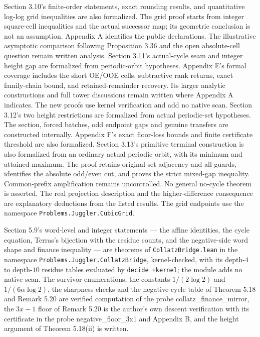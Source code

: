 \documentclass[12pt]{article}
\begin{document}
Section 3.10's finite-order statements, exact rounding results, and
quantitative log-log grid inequalities are also formalized. The grid
proof starts from integer square-cell inequalities and the actual
successor map; its geometric conclusion is not an assumption. Appendix A
identifies the public declarations. The illustrative asymptotic
comparison following Proposition 3.36 and the open absolute-cell
question remain written analysis. Section 3.11's actual-cycle seam and
integer height gap are formalized from periodic-orbit hypotheses.
Appendix E's formal coverage includes the short OE/OOE cells,
subtractive rank returns, exact family-chain bound, and
retained-remainder recovery. Its larger analytic constructions and full
tower discussions remain written where Appendix A indicates. The new
proofs use kernel verification and add no native scan. Section 3.12's
two height restrictions are formalized from actual periodic-set
hypotheses. The section, forced batches, odd endpoint gaps and genuine
transfers are constructed internally. Appendix F's exact floor-loss
bounds and finite certificate threshold are also formalized. Section
3.13's primitive terminal construction is also formalized from an
ordinary actual periodic orbit, with its minimum and attained maximum.
The proof retains original-set adjacency and all guards, identifies the
absolute odd/even cut, and proves the strict mixed-gap inequality.
Common-prefix amplification remains uncontrolled. No general no-cycle
theorem is asserted. The real projection description and the
higher-difference consequence are explanatory deductions from the listed
results. The grid endpoints use the namespace
\texttt{\nolinkurl{Problems.Juggler.CubicGrid}}.

Section 5.9's word-level and integer statements --- the affine
identities, the cycle equation, Terras's bijection with the residue
counts, and the negative-side word shape and finance inequality --- are
theorems of \texttt{\nolinkurl{CollatzBridge.lean}} in the namespace
\texttt{\nolinkurl{Problems.Juggler.CollatzBridge}}, kernel-checked,
with its depth-\(4\) to depth-\(10\) residue tables evaluated by
\texttt{decide\ +kernel}; the module adds no native scan. The survivor
enumerations, the constants \(1/(2\log2)\) and \(1/(6\alpha\log2)\), the
sharpness checks and the negative-cycle table of Theorem 5.18 and Remark
5.20 are verified computation of the probe collatz\_finance\_mirror, the
\(3x-1\) floor of Remark 5.20 is the author's own descent verification
with its certificate in the probe negative\_floor\_3x1 and Appendix B,
and the height argument of Theorem 5.18(ii) is written.
\end{document}
